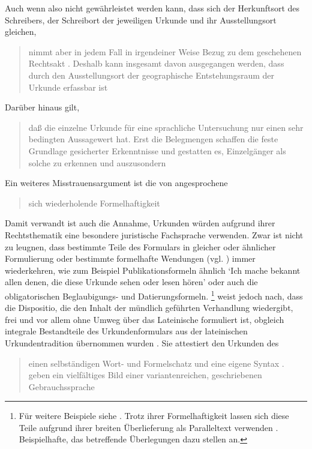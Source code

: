 Auch wenn also nicht gewährleistet werden kann, dass sich der Herkunftsort des
Schreibers, der Schreibort der jeweiligen Urkunde und ihr Ausstellungsort
gleichen, \blockcquote[331--332]{ganslmayeretal2003}{nimmt  aber in jedem Fall in irgendeiner Weise Bezug zu dem
geschehenen Rechtsakt \textelp{}. Deshalb kann insgesamt davon ausgegangen
werden, dass durch den Ausstellungsort der geographische Entstehungsraum der
Urkunde erfassbar ist}.
Darüber hinaus gilt, \blockcquote[122]{deboor1974}{daß die einzelne Urkunde für
eine sprachliche Untersuchung nur einen sehr bedingten Aussagewert hat. Erst
die Belegmengen schaffen die feste Grundlage gesicherter Erkenntnisse und
gestatten es, Einzelgänger als solche zu erkennen und auszusondern}.

Ein weiteres Misstrauensargument ist die von \citeauthor{wegera2000}
angesprochene \blockcquote[1311]{wegera2000}{sich wiederholende
Formelhaftigkeit}. Damit verwandt ist auch die Annahme, Urkunden würden
aufgrund ihrer Rechtsthematik eine besondere juristische Fachsprache verwenden.
Zwar ist nicht zu leugnen, dass bestimmte Teile des Formulars in gleicher oder
ähnlicher Formulierung oder bestimmte formelhafte Wendungen (vgl.
) immer wiederkehren, wie zum Beispiel
Publikationsformeln ähnlich
`Ich mache bekannt allen denen, die diese Urkunde sehen oder lesen hören'
oder auch die obligatorischen Beglaubigungs- und Datierungsformeln.%
%
	\footnote{Für weitere Beispiele siehe \citet[10, Anm.~5--8]{schulze2011}.
	Trotz ihrer Formelhaftigkeit lassen sich diese Teile aufgrund ihrer breiten
	Überlieferung als Paralleltext verwenden
	\autocite[siehe][]{cysouwwaelchli2007}. Beispielhafte, das \CAO{}
	betreffende Überlegungen dazu stellen \citet[174--175]{beckerschallert2022b} an.}
%
\citet{schulze2011} weist jedoch nach, dass die Dispositio, die den Inhalt der
mündlich geführten Verhandlung wiedergibt, frei und vor allem ohne Umweg über
das Lateinische formuliert ist, obgleich integrale Bestandteile des
Urkundenformulars aus der lateinischen Urkundentradition übernommen wurden
\autocite[13, 25--38]{schulze2011}. Sie attestiert den Urkunden des
\CAO{} \blockcquote[3]{schulze1994}{einen selbständigen Wort- und
Formelschatz und eine eigene Syntax \textelp{}.  geben
ein vielfältiges Bild einer variantenreichen, geschriebenen
Gebrauchs\-sprache}.

